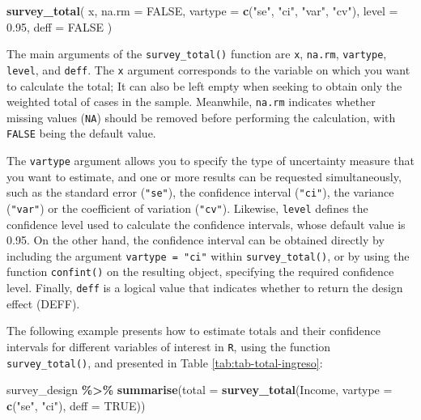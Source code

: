 \documentclass[
  english,
  12pt,
]{book}
\newenvironment{Shaded}{\begin{snugshade}}{\end{snugshade}}
\newcommand{\AttributeTok}[1]{\textcolor[rgb]{0.13,0.29,0.53}{#1}}
\newcommand{\ConstantTok}[1]{\textcolor[rgb]{0.56,0.35,0.01}{#1}}
\newcommand{\FloatTok}[1]{\textcolor[rgb]{0.00,0.00,0.81}{#1}}
\newcommand{\FunctionTok}[1]{\textcolor[rgb]{0.13,0.29,0.53}{\textbf{#1}}}
\newcommand{\NormalTok}[1]{#1}
\newcommand{\SpecialCharTok}[1]{\textcolor[rgb]{0.81,0.36,0.00}{\textbf{#1}}}
\newcommand{\StringTok}[1]{\textcolor[rgb]{0.31,0.60,0.02}{#1}}
\begin{document}
\begin{Shaded}
\begin{Highlighting}[]
\FunctionTok{survey\_total}\NormalTok{(}
\NormalTok{  x,}
  \AttributeTok{na.rm =} \ConstantTok{FALSE}\NormalTok{,}
  \AttributeTok{vartype =} \FunctionTok{c}\NormalTok{(}\StringTok{"se"}\NormalTok{, }\StringTok{"ci"}\NormalTok{, }\StringTok{"var"}\NormalTok{, }\StringTok{"cv"}\NormalTok{),}
  \AttributeTok{level =} \FloatTok{0.95}\NormalTok{,}
  \AttributeTok{deff =} \ConstantTok{FALSE}
\NormalTok{)}
\end{Highlighting}
\end{Shaded}

The main arguments of the \texttt{survey\_total()} function are \texttt{x}, \texttt{na.rm}, \texttt{vartype}, \texttt{level}, and \texttt{deff}. The \texttt{x} argument corresponds to the variable on which you want to calculate the total; It can also be left empty when seeking to obtain only the weighted total of cases in the sample. Meanwhile, \texttt{na.rm} indicates whether missing values (\texttt{NA}) should be removed before performing the calculation, with \texttt{FALSE} being the default value.

The \texttt{vartype} argument allows you to specify the type of uncertainty measure that you want to estimate, and one or more results can be requested simultaneously, such as the standard error (\texttt{"se"}), the confidence interval (\texttt{"ci"}), the variance (\texttt{"var"}) or the coefficient of variation (\texttt{"cv"}). Likewise, \texttt{level} defines the confidence level used to calculate the confidence intervals, whose default value is 0.95. On the other hand, the confidence interval can be obtained directly by including the argument \texttt{vartype\ =\ "ci"} within \texttt{survey\_total()}, or by using the function \texttt{confint()} on the resulting object, specifying the required confidence level. Finally, \texttt{deff} is a logical value that indicates whether to return the design effect (DEFF).

The following example presents how to estimate totals and their confidence intervals for different variables of interest in \texttt{R}, using the function \texttt{survey\_total()}, and presented in Table \ref{tab:tab-total-ingreso}:

\begin{Shaded}
\begin{Highlighting}[]
\NormalTok{survey\_design }\SpecialCharTok{\%\textgreater{}\%}
  \FunctionTok{summarise}\NormalTok{(}\AttributeTok{total =} \FunctionTok{survey\_total}\NormalTok{(Income, }\AttributeTok{vartype =} \FunctionTok{c}\NormalTok{(}\StringTok{"se"}\NormalTok{, }\StringTok{"ci"}\NormalTok{), }\AttributeTok{deff =} \ConstantTok{TRUE}\NormalTok{))}
\end{Highlighting}
\end{Shaded}
\end{document}
